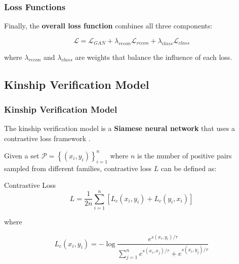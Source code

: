 \documentclass[aspectratio=169]{beamer}
\begin{document}

\begin{frame}
\frametitle{Loss Functions}

Finally, the \textbf{overall loss function} combines all three components:

\vspace{0.7cm}
\begin{equation}
    \mathcal{L} = \mathcal{L}_{GAN} + \lambda_{recon}\mathcal{L}_{recon} + \lambda_{class}\mathcal{L}_{class} 
\end{equation}
\vspace{0.7cm}

where $\lambda_{recon}$ and $\lambda_{class}$ are weights that balance the influence of each loss.

\end{frame}


\subsection{Kinship Verification Model}
\begin{frame}
\frametitle{Kinship Verification Model}

The kinship verification model is a \textbf{Siamese neural network} that uses a contrastive loss framework \cite{sota21}.

Given a set $\mathcal{P} = \left\{ (x_i, y_i) \right\}_{i=1}^{n}$ where $n$ is the number of positive pairs sampled from different families, contrastive loss $L$ can be defined as:

\begin{block}{Contrastive Loss}
\begin{equation}
L = \frac{1}{2n} \sum_{i=1}^{n} \left[ L_c (x_i, y_i) + L_c (y_i, x_i) \right] 
\label{eq:contrastive}
\end{equation}

where

\begin{equation}
L_c (x_i, y_i) = - \log \frac{e^{s(x_i, y_i) / \tau}}{\sum_{j=1}^{n} e^{s(x_i, x_j) / \tau} + e^{s(x_i, y_j) / \tau}}
\label{eq:loss}
\end{equation}
\end{block}

\end{frame}
\end{document}
